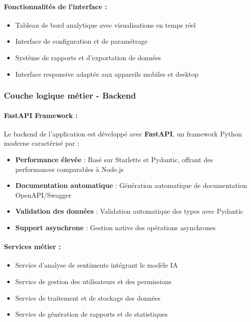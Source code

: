 \paragraph{Fonctionnalités de l'interface :}
\begin{itemize}
    \item Tableau de bord analytique avec visualisations en temps réel
    \item Interface de configuration et de paramétrage
    \item Système de rapports et d'exportation de données
    \item Interface responsive adaptée aux appareils mobiles et desktop
\end{itemize}

\subsubsection{Couche logique métier - Backend}

\paragraph{FastAPI Framework :}
Le backend de l'application est développé avec \textbf{FastAPI}, un framework Python moderne caractérisé par :

\begin{itemize}
    \item \textbf{Performance élevée} : Basé sur Starlette et Pydantic, offrant des performances comparables à Node.js
    \item \textbf{Documentation automatique} : Génération automatique de documentation OpenAPI/Swagger
    \item \textbf{Validation des données} : Validation automatique des types avec Pydantic
    \item \textbf{Support asynchrone} : Gestion native des opérations asynchrones
\end{itemize}

\paragraph{Services métier :}
\begin{itemize}
    \item Service d'analyse de sentiments intégrant le modèle IA
    \item Service de gestion des utilisateurs et des permissions
    \item Service de traitement et de stockage des données
    \item Service de génération de rapports et de statistiques
\end{itemize}

